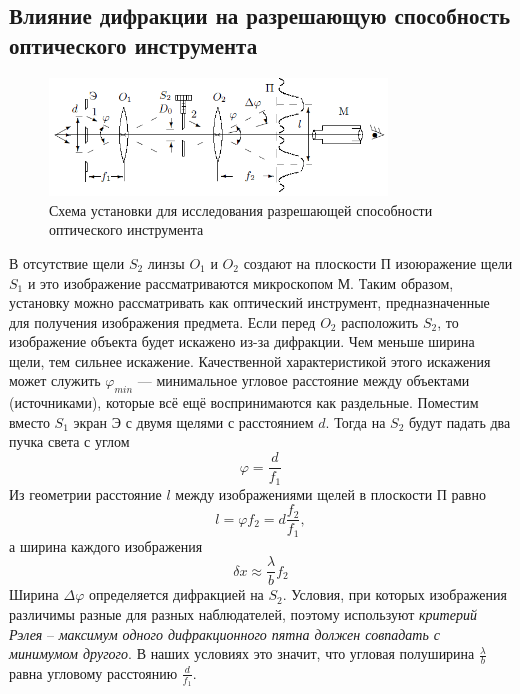 \documentclass[a4paper, 12pt]{article}
\begin{document}
	\subsection{Влияние дифракции на разрешающую способность оптического инструмента}
		\begin{figure}[h]
			\includegraphics[width = 0.8\textwidth]{431-6.png}
			\centering
			\caption{Схема установки для исследования разрешающей способности оптического инструмента}
			\label{Схема оптический инструмент}
		\end{figure}
		В отсутствие щели $S_2$ линзы $O_1$ и $O_2$ создают на плоскости П изоюражение щели $S_1$ и это изображение рассматриваются микроскопом М. Таким образом, установку можно рассматривать как оптический инструмент, предназначенные для получения изображения предмета. Если перед $O_2$ расположить $S_2$, то изображение объекта будет искажено из-за дифракции. Чем меньше ширина щели, тем сильнее искажение. Качественной характеристикой этого искажения может служить $\varphi_{min}$ --- минимальное угловое расстояние между объектами (источниками), которые всё ещё воспринимаются как раздельные. Поместим вместо $S_1$ экран Э с двумя щелями с расстоянием $d$. Тогда на $S_2$ будут падать два пучка света с углом
		\begin{equation}
		\varphi = \dfrac{d}{f_1}
		\end{equation}
		Из геометрии расстояние $l$ между изображениями щелей в плоскости П равно
		\begin{equation}
		l = \varphi f_2 = d \dfrac{f_2}{f_1},
		\label{Расстояние между изображениями щелей}
		\end{equation}
		а ширина каждого изображения
		\begin{equation}
			\delta x \approx \dfrac{\lambda}{b}f_2
			\label{Ширина изображения щели}
		\end{equation}
		Ширина $\Delta \varphi$ определяется дифракцией на $S_2$. Условия, при которых изображения различимы разные для разных наблюдателей, поэтому используют \textit{критерий Рэлея} -- \textit{максимум одного дифракционного пятна должен совпадать с минимумом другого}. В наших условиях это значит, что угловая полуширина $\frac{\lambda}{b}$ равна угловому расстоянию $\frac{d}{f_1}$.
\end{document}
